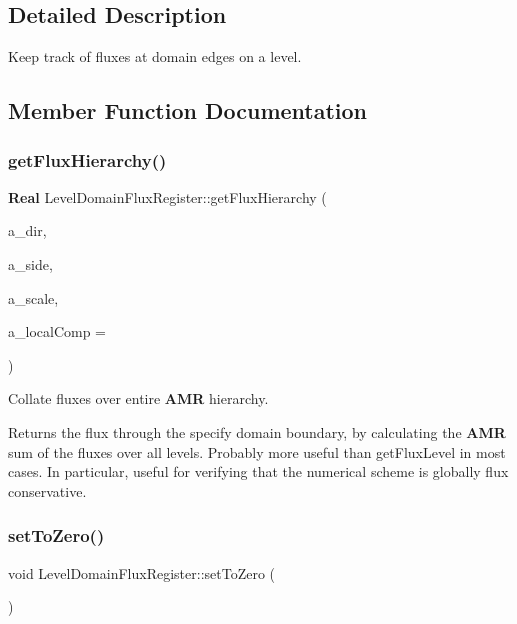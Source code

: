 \subsection{Detailed Description}
Keep track of fluxes at domain edges on a level. 

\subsection{Member Function Documentation}
\mbox{\label{class_level_domain_flux_register_aba734599020a9a525cd0763dc74799da}} 
\subsubsection{\texorpdfstring{get\+Flux\+Hierarchy()}{getFluxHierarchy()}}
{\footnotesize\ttfamily \textbf{ Real} Level\+Domain\+Flux\+Register\+::get\+Flux\+Hierarchy (\begin{DoxyParamCaption}\item[{const int}]{a\+\_\+dir,  }\item[{const \textbf{ Side\+::\+Lo\+Hi\+Side}}]{a\+\_\+side,  }\item[{const \textbf{ Real}}]{a\+\_\+scale,  }\item[{const int}]{a\+\_\+local\+Comp = {} }\end{DoxyParamCaption})}



Collate fluxes over entire \textbf{ A\+MR} hierarchy. 

Returns the flux through the specify domain boundary, by calculating the \textbf{ A\+MR} sum of the fluxes over all levels. Probably more useful than get\+Flux\+Level in most cases. In particular, useful for verifying that the numerical scheme is globally flux conservative. \mbox{\label{class_level_domain_flux_register_a973e5a08f8e4df24cbdf4664e8b17b70}} 
\subsubsection{\texorpdfstring{set\+To\+Zero()}{setToZero()}}
{\footnotesize\ttfamily void Level\+Domain\+Flux\+Register\+::set\+To\+Zero (\begin{DoxyParamCaption}{ }\end{DoxyParamCaption})}



